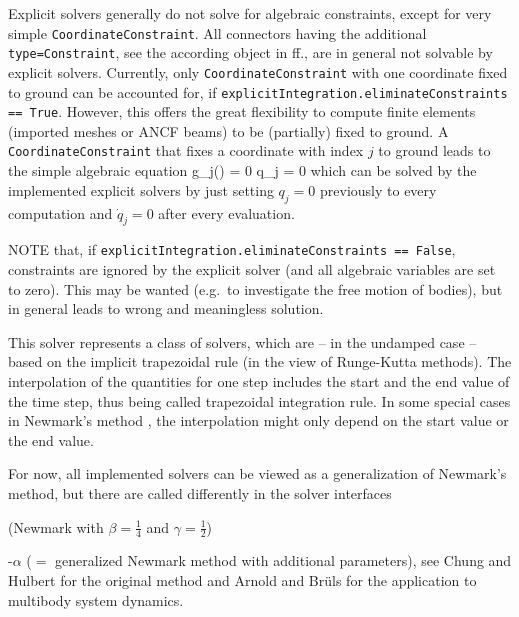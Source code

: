 Explicit solvers generally do not solve for algebraic constraints, except for very simple \texttt{CoordinateConstraint}. 
All connectors having the additional \texttt{type=Constraint}, see the according object in ff., 
are in general not solvable by explicit solvers. 
Currently, only \texttt{CoordinateConstraint} with one coordinate fixed to ground can be accounted for, 
if \texttt{explicitIntegration.eliminateConstraints == True}. 
However, this offers the great flexibility to compute finite elements (imported meshes or ANCF beams) to be (partially) fixed to ground.
A \texttt{CoordinateConstraint} that fixes a coordinate with index $j$ to ground leads to the simple algebraic  equation
\be
  g_j(\qv) = 0 \quad \Leftrightarrow \quad  q_j = 0
\ee
which can be solved by the implemented explicit solvers by just setting $q_j = 0$ previously to every computation and $\dot q_j = 0$ after every  evaluation.

NOTE that, if \texttt{explicitIntegration.eliminateConstraints == False}, constraints are ignored by the explicit solver (and all algebraic variables are set to zero). This may be wanted (e.g.\ to investigate the free motion of bodies), but in general leads to wrong and meaningless solution.

This solver represents a class of solvers, which are -- in the undamped case -- based on the implicit trapezoidal rule (in the view of Runge-Kutta methods). The interpolation of the quantities for one step includes the start and the end value of the time step, thus being called trapezoidal integration rule. In some special cases in Newmark's method \cite{Newmark1959}, the interpolation might only depend on the start value or the end value.

For now, all implemented solvers can be viewed as a generalization of Newmark's method, but there are called differently in the solver interfaces
\bi
  \item {} (Newmark with $\beta = \frac 1 4$ and $\gamma = \frac 1 2$) 
  \item {} \cite{Newmark1959}
  \item {}-$\alpha$  ($=$ generalized Newmark method with additional parameters), see Chung and Hulbert \cite{Chung1993} for the original method and Arnold and Br\"uls \cite{Arnold2007} for the application to multibody system dynamics.
\ei

